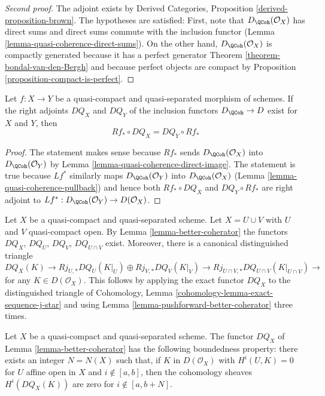 \begin{proof}[Second proof]
The adjoint exists by Derived Categories, Proposition
\ref{derived-proposition-brown}. The hypotheses are satisfied:
First, note that $D_\QCoh(\mathcal{O}_X)$ has direct sums
and direct sums commute with the inclusion functor
(Lemma \ref{lemma-quasi-coherence-direct-sums}).
On the other hand, $D_\QCoh(\mathcal{O}_X)$
is compactly generated because it has a perfect
generator Theorem \ref{theorem-bondal-van-den-Bergh}
and because perfect objects are compact by
Proposition \ref{proposition-compact-is-perfect}.
\end{proof}

\begin{lemma}
\label{lemma-pushforward-better-coherator}
Let $f : X \to Y$ be a quasi-compact and quasi-separated
morphism of schemes. If the right adjoints $DQ_X$ and $DQ_Y$
of the inclusion functors $D_\QCoh \to D$ exist for $X$ and $Y$, then
$$
Rf_* \circ DQ_X = DQ_Y \circ Rf_*
$$
\end{lemma}

\begin{proof}
The statement makes sense because $Rf_*$ sends
$D_\QCoh(\mathcal{O}_X)$ into $D_\QCoh(\mathcal{O}_Y)$ by
Lemma \ref{lemma-quasi-coherence-direct-image}.
The statement is true because $Lf^*$ similarly maps
$D_\QCoh(\mathcal{O}_Y)$ into $D_\QCoh(\mathcal{O}_X)$
(Lemma \ref{lemma-quasi-coherence-pullback})
and hence both $Rf_* \circ DQ_X$ and $DQ_Y \circ Rf_*$
are right adjoint to $Lf^* : D_\QCoh(\mathcal{O}_Y) \to D(\mathcal{O}_X)$.
\end{proof}

\begin{remark}
\label{remark-explain-consequence}
Let $X$ be a quasi-compact and quasi-separated scheme.
Let $X = U \cup V$ with $U$ and $V$ quasi-compact open.
By Lemma \ref{lemma-better-coherator} the functors
$DQ_X$, $DQ_U$, $DQ_V$, $DQ_{U \cap V}$ exist. Moreover, there is a
canonical distinguished triangle
$$
DQ_X(K) \to Rj_{U, *}DQ_U(K|_U) \oplus Rj_{V, *}DQ_V(K|_V)
\to Rj_{U \cap V, *}DQ_{U \cap V}(K|_{U \cap V}) \to
$$
for any $K \in D(\mathcal{O}_X)$. This follows by applying the
exact functor $DQ_X$ to the distinguished triangle of
Cohomology, Lemma \ref{cohomology-lemma-exact-sequence-j-star}
and using Lemma \ref{lemma-pushforward-better-coherator} three times.
\end{remark}

\begin{lemma}
\label{lemma-boundedness-better-coherator}
Let $X$ be a quasi-compact and quasi-separated scheme. The functor
$DQ_X$ of Lemma \ref{lemma-better-coherator}
has the following boundedness property:
there exists an integer $N = N(X)$ such that, if
$K$ in $D(\mathcal{O}_X)$ with
$H^i(U, K) = 0$ for $U$ affine open in $X$ and $i \not \in [a, b]$, then
the cohomology sheaves $H^i(DQ_X(K))$ are zero for
$i \not \in [a, b + N]$.
\end{lemma}


